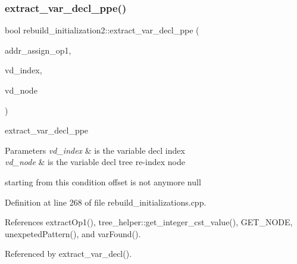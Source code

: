 \subsubsection{\texorpdfstring{extract\+\_\+var\+\_\+decl\+\_\+ppe()}{extract\_var\_decl\_ppe()}}
{\footnotesize\ttfamily bool rebuild\+\_\+initialization2\+::extract\+\_\+var\+\_\+decl\+\_\+ppe (\begin{DoxyParamCaption}\item[{\hyperlink{tree__node_8hpp_a6ee377554d1c4871ad66a337eaa67fd5}{tree\+\_\+node\+Ref}}]{addr\+\_\+assign\+\_\+op1,  }\item[{unsigned \&}]{vd\+\_\+index,  }\item[{\hyperlink{tree__node_8hpp_a6ee377554d1c4871ad66a337eaa67fd5}{tree\+\_\+node\+Ref} \&}]{vd\+\_\+node }\end{DoxyParamCaption})\hspace{0.3cm}{\ttfamily [private]}}



extract\+\_\+var\+\_\+decl\+\_\+ppe 


\begin{DoxyParams}{Parameters}
{\em vd\+\_\+index} & is the variable decl index \\
\hline
{\em vd\+\_\+node} & is the variable decl tree re-\/index node \\
\hline
\end{DoxyParams}
starting from this condition offset is not anymore null 

Definition at line 268 of file rebuild\+\_\+initializations.\+cpp.



References extract\+Op1(), tree\+\_\+helper\+::get\+\_\+integer\+\_\+cst\+\_\+value(), G\+E\+T\+\_\+\+N\+O\+DE, unexpeted\+Pattern(), and var\+Found().



Referenced by extract\+\_\+var\+\_\+decl().

